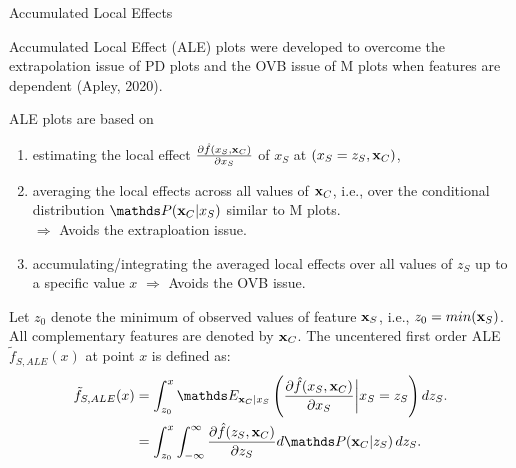\documentclass[11pt,compress,t,notes=noshow, xcolor=table]{beamer}
\begin{document}
\begin{vbframe}{Accumulated Local Effects}

Accumulated Local Effect (ALE) plots were developed to overcome the extrapolation issue of PD plots and the OVB issue of M plots when features are dependent (Apley, 2020).

\lz

ALE plots are based on
\begin{enumerate}
\item estimating the local effect $\frac{\partial \fh(x_S, \xv_C)}{\partial x_S}$ of $x_S$ at $(x_S = z_S, \xv_C)$,
\item averaging the local effects across all values of $\xv_C$, i.e., over the conditional distribution $\P(\xv_C|x_S)$ similar to M plots.\\
$\Rightarrow$ Avoids the extraploation issue.
\item accumulating/integrating the averaged local effects over all values of $z_S$ up to a specific value $x$ $\Rightarrow$ Avoids the OVB issue.
\end{enumerate}

\framebreak

Let $z_0$ denote the minimum of observed values of feature $\xv_S$, i.e., $z_0 = min(\xv_S)$. All complementary features are denoted by $\xv_C$.
The uncentered first order ALE $\tilde{f}_{S, ALE}(x)$ at point $x$ is defined as:
$$
\begin{aligned}
\tilde{f}_{S, ALE}(x) &= \int_{z_{0}}^{x} \E_{\xv_C \vert x_S} \left(\frac{\partial \fh(x_S, \xv_C)}{\partial x_S} \bigg \vert x_S = z_S \right) dz_S. \\
&= \int_{z_{0}}^{x} \int_{-\infty}^{\infty}  \frac{\partial \fh(z_S, \xv_C)}{\partial z_S} d\P(\xv_C | z_S) \, dz_S.
\end{aligned}
$$

\end{vbframe}
\end{document}

